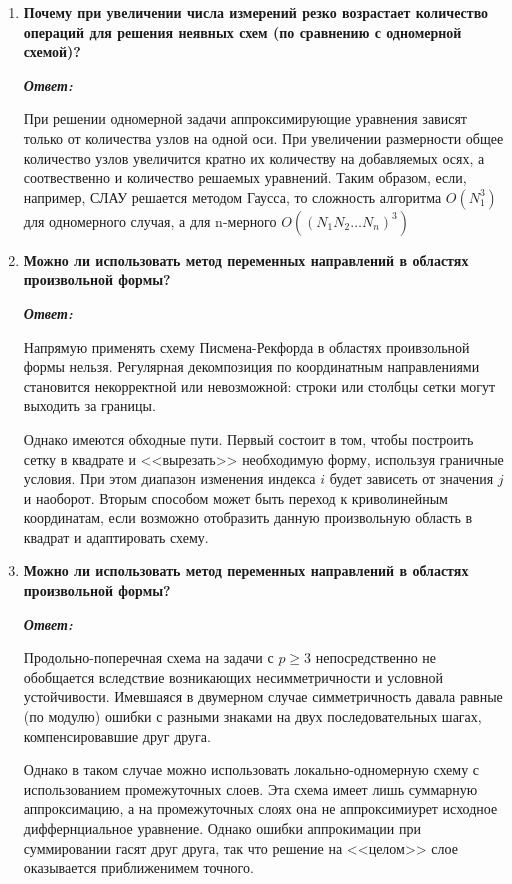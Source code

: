 \documentclass[12pt, a4paper]{article}
\begin{document}
\begin{enumerate}
		\item \textbf{ Почему при увеличении числа измерений резко возрастает количество операций для решения неявных схем (по сравнению с одномерной схемой)?}
		\vspace*{0.2cm}
		
		\textit{\textbf{Ответ:}} 
		
		 При решении одномерной задачи аппроксимирующие уравнения зависят только от количества узлов на одной оси. При увеличении размерности общее количество узлов увеличится кратно их количеству на добавляемых осях, а соотвественно и количество решаемых уравнений. Таким образом, если, например, СЛАУ решается методом Гаусса, то сложность алгоритма $O(N_1^3)$ для одномерного случая, а для n-мерного $O((N_1 N_2 \ldots N_n)^3)$ 
		
		\item \textbf{Можно ли использовать метод переменных направлений в областях произвольной формы?}
		\vspace*{0.2cm}
		
		\textit{\textbf{Ответ:}}
		
		Напрямую применять схему Писмена-Рекфорда в областях проивзольной формы нельзя. Регулярная декомпозиция по координатным направлениями становится некорректной или невозможной: строки или столбцы сетки могут выходить за границы.
		
		Однако имеются обходные пути. Первый состоит в том, чтобы построить сетку в квадрате и <<вырезать>> необходимую форму, используя граничные условия. При этом диапазон изменения индекса $i$ будет зависеть от значения $j$ и наоборот. Вторым способом может быть переход к криволинейным координатам, если возможно отобразить данную произвольную область в квадрат и адаптировать схему.
		
		\item \textbf{Можно ли использовать метод переменных направлений в областях произвольной формы?}
		\vspace*{0.2cm}
		
		\textit{\textbf{Ответ:}}
		
		Продольно-поперечная схема на задачи с $p \ge 3$ непосредственно не обобщается вследствие возникающих несимметричности и условной устойчивости. Имевшаяся в двумерном случае симметричность давала равные (по модулю) ошибки с разными знаками на двух последовательных шагах, компенсировавшие друг друга.
		
		Однако в таком случае можно использовать локально-одномерную схему с использованием промежуточных слоев. Эта схема имеет лишь суммарную аппроксимацию, а на промежуточных слоях она не аппроксимиурет исходное диффернциальное уравнение. Однако ошибки аппрокимации при суммировании гасят друг друга, так что решение на <<целом>> слое оказывается приближенимем точного.
		

\end{enumerate}
\end{document}
